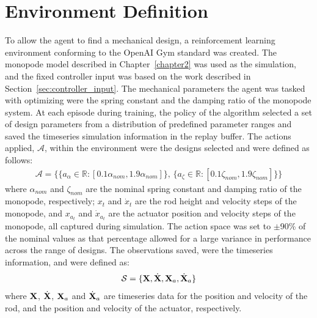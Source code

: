 \section{Environment Definition}
To allow the agent to find a mechanical design, a reinforcement learning environment conforming to the OpenAI Gym standard \cite{Brockman2016c} was created. The monopode model described in Chapter~\ref{chapter2} was used as the simulation, and the fixed controller input was based on the work described in Section~\ref{sec:controller_input}. The mechanical parameters the agent was tasked with optimizing were the spring constant and the damping ratio of the monopode system. At each episode during training, the policy of the algorithm selected a set of design parameters from a distribution of predefined parameter ranges and saved the timeseries simulation information in the replay buffer. The actions applied, $\mathcal{A}$, within the environment were the designs selected and were defined as follows:
% 
\begin{equation}
    \label{eq:mech_action}
    \begin{aligned}
    \mathcal{A} = \{ \{ a_{\alpha} \in \mathbb{R}: [0.1 \alpha_{nom}, 1.9 \alpha_{nom}] \}, \, \{ a_{\zeta} \in \mathbb{R}: [0.1 \zeta_{nom}, 1.9 \zeta_{nom}] \} \}
    \end{aligned}
\end{equation}
% 
where $\alpha_{nom}$ and $\zeta_{nom}$ are the nominal spring constant and damping ratio of the monopode, respectively; $x_t$ and $\dot{x}_t$ are the rod height and velocity steps of the monopode, and $x_{a_t}$ and $\dot{x}_{a_t}$ are the actuator position and velocity steps of the monopode, all captured during simulation. The action space was set to $\pm$90\% of the nominal values as that percentage allowed for a large variance in performance across the range of designs. The observations saved, were the timeseries information, and were defined as:
% 
\begin{equation}
    \label{eq:mech_transitions}
    \mathcal{S}= \{ \textup{\textbf{X}}, \dot{\textup{\textbf{X}}}, \textup{\textbf{X}}_a, \dot{\textup{\textbf{X}}}_a \}
\end{equation}
% 
where $\textup{\textbf{X}}$, $\dot{\textup{\textbf{X}}}$, $\textup{\textbf{X}}_a$ and $\dot{\textup{\textbf{X}}}_a$ are timeseries data for the position and velocity of the rod, and the position and velocity of the actuator, respectively.


